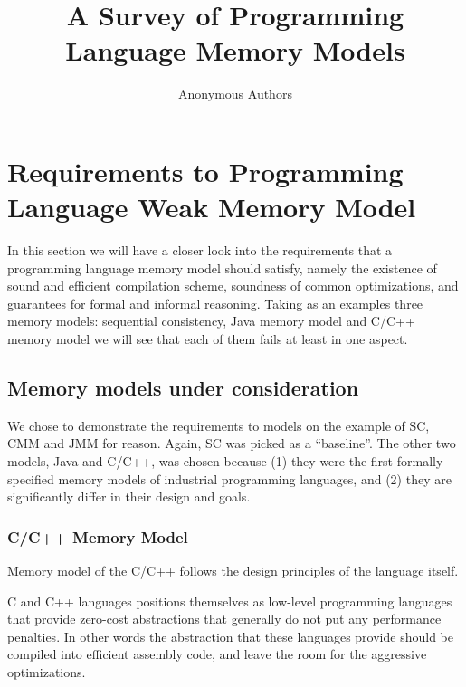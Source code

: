 \documentclass[a4paper,twoside,11pt]{article}
\author{Anonymous Authors}
\title{A Survey of Programming Language Memory Models}
\date{}
\numberwithin{equation}{section}
\begin{document}
\maketitle

\begin{abstract}
\end{abstract}





\section{Requirements to Programming Language Weak Memory Model}

In this section we will have a closer look into the requirements 
that a programming language memory model should satisfy, 
namely the existence of sound and efficient compilation scheme, 
soundness of common optimizations, and guarantees for formal and informal reasoning.  
Taking as an examples three memory models: 
sequential consistency, Java memory model and C/C++ memory model
we will see that each of them fails at least in one aspect.

\subsection{Memory models under consideration}

We chose to demonstrate the requirements to models on the example of SC, CMM and JMM for reason.
Again, SC was picked as a ``baseline''.
The other two models, Java and C/C++, was chosen because 
(1) they were the first formally specified memory models of industrial programming languages, and
(2) they are significantly differ in their design and goals.

\subsubsection{C/C++ Memory Model}

Memory model of the C/C++ follows the design principles of the language itself.

C and C++ languages positions themselves as low-level programming languages
that provide zero-cost abstractions that generally do not put any performance penalties. 
In other words the abstraction that these languages provide 
should be compiled into efficient assembly code,
and leave the room for the aggressive optimizations.
\end{document}
